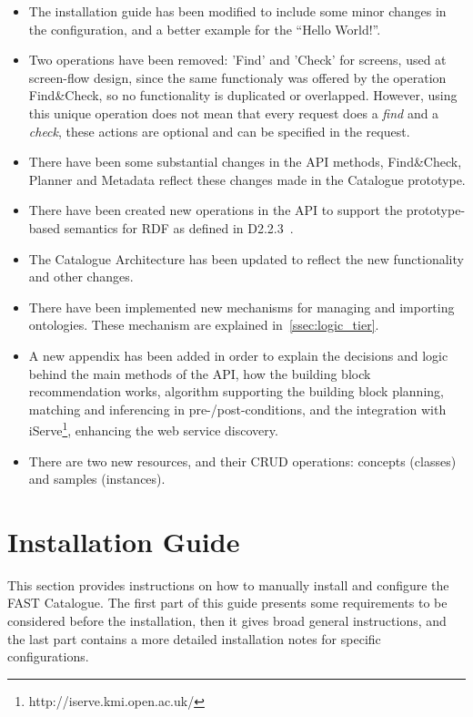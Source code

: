 \documentclass{fast_latex}
\begin{document}
\begin{itemize}
 \item The installation guide has been modified to include some minor changes in the configuration, and a better example for the ``Hello World!''.
 \item Two operations have been removed: 'Find' and 'Check' for screens, used at screen-flow design, since the same functionaly was offered by the operation Find\&Check, so no functionality is duplicated or overlapped. However, using this unique operation does not mean that every request does a \emph{find} and a \emph{check}, these actions are optional and can be specified in the request.
 \item There have been some substantial changes in the API methods, Find\&Check, Planner and Metadata reflect these changes made in the Catalogue prototype.
 \item There have been created new operations in the API to support the prototype-based semantics for RDF as defined in D2.2.3~\cite{moeller2011fast_ontology}.
 \item The Catalogue Architecture has been updated to reflect the new functionality and other changes.
 \item There have been implemented new mechanisms for managing and importing ontologies. These mechanism are explained in~\ref{ssec:logic_tier}.
 \item A new appendix has been added in order to explain the decisions and logic behind the main methods of the API, how the building block recommendation works, algorithm supporting the building block planning, matching and inferencing in pre-/post-conditions, and the integration with iServe\footnote{http://iserve.kmi.open.ac.uk/}, enhancing the web service discovery.
 \item There are two new resources, and their CRUD operations: concepts (classes) and samples (instances).
\end{itemize}



\clearpage
\section{Installation Guide} %
\label{sec:installation_guide}

This section provides instructions on how to manually install and configure the FAST Catalogue. The first part of this guide presents some requirements to be considered before the installation, then it gives broad general instructions, and the last part contains a more detailed installation notes for specific configurations.
\end{document}
